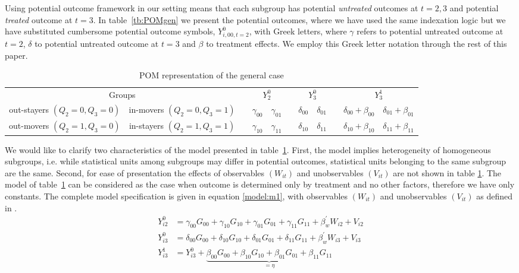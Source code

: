 \documentclass[12pt]{article}
\begin{document}
Using potential outcome framework in our setting means that each subgroup has potential \textit{untreated} outcomes at $t=2,3$ and potential \textit{treated} outcome at $t=3$. In table~\vref{tb:POMgen} we present the potential outcomes, where we have used the same indexation logic but we have substituted cumbersome potential outcome symbols, $Y_{i,00,t=2}^0$, with Greek letters, where $\gamma$ refers to potential untreated outcome at $t=2$, $\delta$ to potential untreated outcome at $t=3$ and $\beta$ to treatment effects. We employ this Greek letter notation through the rest of this paper. 
\begin{table}[h]
	\caption{POM representation of the general case}
	\label{tb:POMgen}
	\centering
	\begin{tabular}{cc c cc c cc c cc}
		\multicolumn{2}{c}{Groups} & & \multicolumn{2}{c}{$Y_2^0$} & & \multicolumn{2}{c}{$Y_3^0$} & & \multicolumn{2}{c}{$Y_3^1$} \\
		\cline{1-2} \cline{4-5} \cline{7-8} \cline{10-11}
		\scriptsize{out-stayers $(Q_2 = 0,Q_3 = 0)$} & \scriptsize{in-movers $(Q_2 = 0,Q_3 = 1)$} & & $\gamma_{00}$ & $\gamma_{01}$& & $\delta_{00}$ & $\delta_{01}$ & & $\delta_{00}+\beta_{00}$ & $\delta_{01}+\beta_{01}$ \\
		\scriptsize{out-movers $(Q_2 = 1,Q_3 = 0)$} & \scriptsize{in-stayers $(Q_2 = 1,Q_3 = 1)$} & & $\gamma_{10}$ & $\gamma_{11}$& & $\delta_{10}$ & $\delta_{11}$ & & $\delta_{10}+\beta_{10}$ & $\delta_{11}+\beta_{11}$ \\		
	\end{tabular}
\end{table}
We would like to clarify two characteristics of the model presented in table~\ref{tb:POMgen}. First, the model implies heterogeneity of homogeneous subgroups, i.e. while statistical units among subgroups may differ in potential outcomes, statistical units belonging to the same subgroup are the same. Second, for ease of presentation the effects of observables $(W_{it})$ and unobservables $(V_{it})$ are not shown in table \ref{tb:POMgen}. The model of table~\ref{tb:POMgen} can be considered as the case when outcome is determined only by treatment and no other factors, therefore we have only constants. The complete model specification is given in equation \vref{model:m1}, with observables $(W_{it})$ and unobservables $(V_{it})$ as defined in \cite{lee2014difference}.
\begin{equation}\tag{$M_1$}
\label{model:m1}
\begin{split}
Y_{i2}^0 &= \gamma_{00}G_{00} + \gamma_{10}G_{10} + \gamma_{01}G_{01}  + \gamma_{11}G_{11} + \beta_w^\prime W_{i2} + V_{i2}\\
Y_{i3}^0 &= \delta_{00}G_{00} + \delta_{10}G_{10} + \delta_{01}G_{01}  + \delta_{11}G_{11} + \beta_w^\prime W_{i3} + V_{i3} \\
Y_{i3}^1 &= Y_{i3}^0 + \underset{=\eta}{\underbrace{\beta_{00}G_{00} + \beta_{10}G_{10} + \beta_{01}G_{01}  + \beta_{11}G_{11}}} 
\end{split} 
\end{equation}	 
\end{document}
